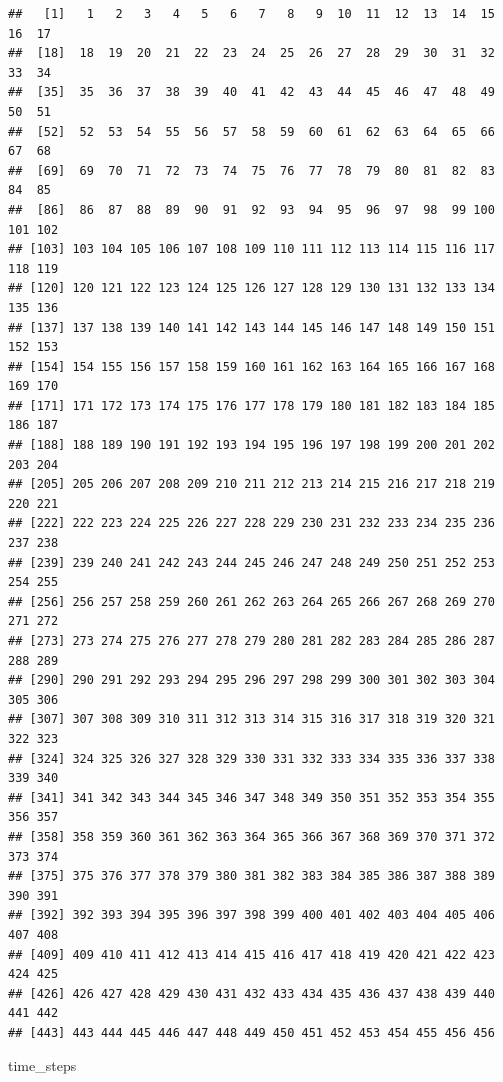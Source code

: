 \documentclass[]{book}
\newenvironment{Shaded}{\begin{snugshade}}{\end{snugshade}}
\newcommand{\NormalTok}[1]{{#1}}
\theoremstyle{definition}
\theoremstyle{definition}
\theoremstyle{definition}
\theoremstyle{remark}
\begin{document}
\begin{verbatim}
##   [1]   1   2   3   4   5   6   7   8   9  10  11  12  13  14  15  16  17
##  [18]  18  19  20  21  22  23  24  25  26  27  28  29  30  31  32  33  34
##  [35]  35  36  37  38  39  40  41  42  43  44  45  46  47  48  49  50  51
##  [52]  52  53  54  55  56  57  58  59  60  61  62  63  64  65  66  67  68
##  [69]  69  70  71  72  73  74  75  76  77  78  79  80  81  82  83  84  85
##  [86]  86  87  88  89  90  91  92  93  94  95  96  97  98  99 100 101 102
## [103] 103 104 105 106 107 108 109 110 111 112 113 114 115 116 117 118 119
## [120] 120 121 122 123 124 125 126 127 128 129 130 131 132 133 134 135 136
## [137] 137 138 139 140 141 142 143 144 145 146 147 148 149 150 151 152 153
## [154] 154 155 156 157 158 159 160 161 162 163 164 165 166 167 168 169 170
## [171] 171 172 173 174 175 176 177 178 179 180 181 182 183 184 185 186 187
## [188] 188 189 190 191 192 193 194 195 196 197 198 199 200 201 202 203 204
## [205] 205 206 207 208 209 210 211 212 213 214 215 216 217 218 219 220 221
## [222] 222 223 224 225 226 227 228 229 230 231 232 233 234 235 236 237 238
## [239] 239 240 241 242 243 244 245 246 247 248 249 250 251 252 253 254 255
## [256] 256 257 258 259 260 261 262 263 264 265 266 267 268 269 270 271 272
## [273] 273 274 275 276 277 278 279 280 281 282 283 284 285 286 287 288 289
## [290] 290 291 292 293 294 295 296 297 298 299 300 301 302 303 304 305 306
## [307] 307 308 309 310 311 312 313 314 315 316 317 318 319 320 321 322 323
## [324] 324 325 326 327 328 329 330 331 332 333 334 335 336 337 338 339 340
## [341] 341 342 343 344 345 346 347 348 349 350 351 352 353 354 355 356 357
## [358] 358 359 360 361 362 363 364 365 366 367 368 369 370 371 372 373 374
## [375] 375 376 377 378 379 380 381 382 383 384 385 386 387 388 389 390 391
## [392] 392 393 394 395 396 397 398 399 400 401 402 403 404 405 406 407 408
## [409] 409 410 411 412 413 414 415 416 417 418 419 420 421 422 423 424 425
## [426] 426 427 428 429 430 431 432 433 434 435 436 437 438 439 440 441 442
## [443] 443 444 445 446 447 448 449 450 451 452 453 454 455 456 456
\end{verbatim}

\begin{Shaded}
\begin{Highlighting}[]
\NormalTok{time_steps }
\end{Highlighting}
\end{Shaded}
\end{document}
